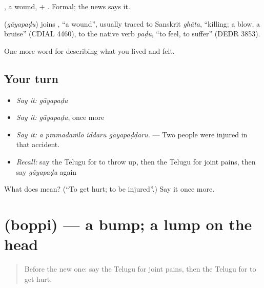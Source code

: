 , a wound, + . Formal; the news says it.

\begin{cousinweb}
\textbf{} (\emph{gāyapaḍu}) joins , \textquotedblleft{}a wound\textquotedblright{}, usually traced to Sanskrit \emph{ghāta}, \textquotedblleft{}killing; a blow, a bruise\textquotedblright{} (CDIAL 4460), to the native verb \emph{paḍu}, \textquotedblleft{}to feel, to suffer\textquotedblright{} (DEDR 3853).
\end{cousinweb}

\begin{grammarlens}[title={What you've built}]
One more word for describing what you lived and felt.
\end{grammarlens}

\subsection*{Your turn}
\begin{itemize}
\raggedright
  \item \emph{Say it:} \emph{gāyapaḍu}
  \item \emph{Say it:} \emph{gāyapaḍu}, once more
  \item \emph{Say it:} \emph{ā pramādaṁlō iddaru gāyapaḍḍāru.} — Two people were injured in that accident.
  \item \emph{Recall:} say the Telugu for to throw up, then the Telugu for joint pains, then say \emph{gāyapaḍu} again
\end{itemize}

\begin{tcolorbox}[breakable,colback=teal!4,colframe=teal!35!black,title={Before you move on}]
What does  mean? (\textquotedblleft{}To get hurt; to be injured\textquotedblright{}.) Say it once more.
\end{tcolorbox}
\section[\texorpdfstring{\te{బొప్పి} (boppi)}{బొప్పి (boppi)}]{ (boppi) — a bump; a lump on the head}

\label{lesson:TE-C518-boppi}



\begin{quote}
Before the new one: say the Telugu for joint pains, then the Telugu for to get hurt.
\end{quote}

